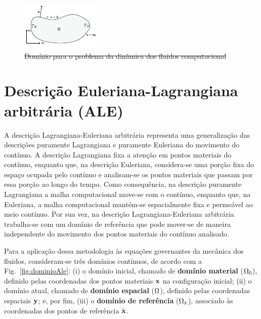 \documentclass[tese_patricia]{subfiles}%
\begin{document}
\begin{figure}[htb!]
	\centering 
	\includegraphics[scale=3.0,trim=0cm 0.0cm 0cm 0.0cm, clip=true]{Imagens/Cap2/dominioFluido.pdf}	
	\caption{\sout{Domínio para o problema da dinâmica dos fluidos computacional}}
	\label{fig:dominioFluido}
\end{figure}

\section{Descrição Euleriana-Lagrangiana arbitrária (ALE)} \label{capitulo:Cap2:ALE}

A descrição Lagrangiana-Euleriana arbitrária \cite{HughesLZ:1981, DoneaGH:1982} representa uma generalização das descrições puramente Lagrangiana e puramente Euleriana do movimento do contínuo. A descrição Lagrangiana fixa a atenção em pontos materiais do contínuo, enquanto que, na descrição Euleriana, considera-se uma porção fixa do espaço ocupada pelo contínuo e analisam-se os pontos materiais que passam por essa porção ao longo do tempo. Como consequência, na descrição puramente Lagrangiana a malha computacional move-se com o contínuo, enquanto que, na Euleriana, a malha computacional mantém-se espacialmente fixa e permeável ao meio contínuo. Por sua vez, na descrição Lagrangiana-Euleriana arbitrária trabalha-se com um domínio de referência que pode mover-se de maneira independente do movimento dos pontos materiais do contínuo analisado.

Para a aplicação dessa metodologia às equações governantes da mecânica dos fluidos, consideram-se três domínios contínuos, de acordo com a Fig.~\ref{fig:dominioAle}: (i) o domínio inicial, chamado de \textbf{domínio material} ($\Omega_{0}$), definido pelas coordenadas dos pontos materiais $\mathbf{x}$ na configuração inicial; (ii) o domínio atual, chamado de \textbf{domínio espacial} ($\Omega$), definido pelas coordenadas espaciais $\mathbf{y}$; e, por fim, (iii) o \textbf{domínio de referência} ($\Omega_{\bar{x}}$), associado às coordenadas dos pontos de referência $\bar{\mathbf{x}}$.
\end{document}

